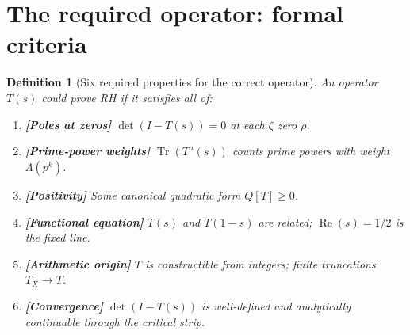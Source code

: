 \documentclass[11pt]{article}
\newtheorem{definition}[theorem]{Definition}
\theoremstyle{remark}
\DeclareRobustCommand{\_}{\ifmmode\text{\textunderscore}\else\textunderscore\allowbreak\fi}
\begin{document}
\section{The required operator: formal criteria}

\begin{definition}[Six required properties for the correct operator]
An operator $T(s)$ could prove RH if it satisfies all of:

\begin{enumerate}[label=\textbf{P\arabic*}]
\item \textbf{[Poles at zeros]} $\det(I-T(s)) = 0$ at each $\zeta$ zero $\rho$.
\item \textbf{[Prime-power weights]} $\operatorname{Tr}(T^n(s))$ counts prime powers with weight $\Lambda(p^k)$.
\item \textbf{[Positivity]} Some canonical quadratic form $Q[T] \geq 0$.
\item \textbf{[Functional equation]} $T(s)$ and $T(1-s)$ are related; $\operatorname{Re}(s)=1/2$ is the fixed line.
\item \textbf{[Arithmetic origin]} $T$ is constructible from integers; finite truncations $T_X \to T$.
\item \textbf{[Convergence]} $\det(I-T(s))$ is well-defined and analytically continuable through the critical strip.
\end{enumerate}
\end{definition}
\end{document}
